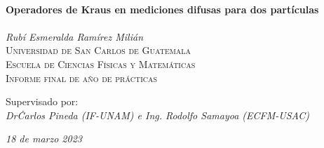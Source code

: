 
\begin{titlepage}
\vbox{ }
\vbox{ }
\begin{center}
	\HRule{} \\[0.4cm]
	{ \huge \bfseries Operadores de Kraus en mediciones difusas para dos partículas}\\[0.4cm]
	\HRule{} \\[1.5cm]
	
	
	\Large
	\textit{Rubí Esmeralda Ramírez Milián}\\[1.5cm]
\textsc{\Large Universidad de San Carlos de Guatemala}\\[0.2cm]
\textsc{\Large Escuela de Ciencias Físicas y Matemáticas}\\[1.5cm]
\textsc{\large Informe final de año de prácticas}\\[1.5cm]
\vbox{ }


\large
Supervisado por:\\
\emph{Dr\. Carlos Pineda (IF-UNAM) e Ing. Rodolfo Samayoa (ECFM-USAC)}\\
\vfill

{\large\emph{18 de marzo 2023}}
\end{center}
\end{titlepage}